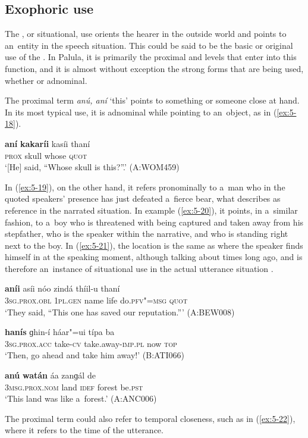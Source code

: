 \subsection{Exophoric use}
\label{subsec:5-2-3}

The , or situational, use orients the hearer in the outside world and points to an~entity in the speech situation. This could be said to be the basic or original use of the . In Palula, it is primarily the proximal and  levels that enter into this function, and it is almost without exception the strong forms that are being used, whether  or adnominal.


The proximal term \textit{anú, aní} `this' points to something or someone close at hand. In its most typical use, it is adnominal while pointing to an~object, as in (\ref{ex:5-18}).

\begin{exe}
\ex
\label{ex:5-18}
\gll \textbf{aní} \textbf{kakaríi} kasíi thaní \\
\textsc{prox} skull whose \textsc{quot} \\
\glt `[He] said, ``Whose skull is this?''.' (A:WOM459)
\end{exe}
In (\ref{ex:5-19}), on the other hand, it refers pronominally to a~man who in the quoted speakers' presence has just defeated a~fierce bear, what \citet[222]{himmelmann1996} describes as reference in the narrated situation. In example (\ref{ex:5-20}), it points, in a~similar fashion, to a~boy who is threatened with being captured and taken away from his stepfather, who is the speaker within the narrative, and who is standing right next to the boy. In (\ref{ex:5-21}), the location is the same as where the speaker finds himself in at the speaking moment, although talking about times long ago, and is therefore an~instance of situational use in the actual utterance situation \citep[222]{himmelmann1996}.

\begin{exe}
\ex
\label{ex:5-19}
\gll \textbf{aníi} asíi nóo zindá thíil-u thaní \\
\textsc{3sg.prox.obl} \textsc{1pl.gen} name life do.\textsc{pfv"=msg} \textsc{quot} \\
\glt `They said, ``This one has saved our reputation.''' (A:BEW008)

\ex
\label{ex:5-20}
\gll \textbf{hanís} ɡhin-í háar"=ui típa ba \\
\textsc{3sg.prox.acc} take-\textsc{cv} take.away-\textsc{imp.pl} now \textsc{top} \\
\glt `Then, go ahead and take him away!' (B:ATI066)

\ex
\label{ex:5-21}
\gll \textbf{anú} \textbf{watán} áa zanɡál de \\
\textsc{3msg.prox.nom} land \textsc{idef} forest be.\textsc{pst} \\
\glt `This land was like a~forest.' (A:ANC006)
\end{exe}
The proximal term could also refer to temporal closeness, such as in (\ref{ex:5-22}), where it refers to the time of the utterance.

